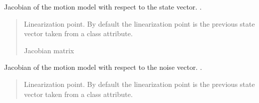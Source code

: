 \documentclass[letterpaper,10pt,english]{sphinxmanual}
\begin{document}
\begin{fulllineitems}
\begin{fulllineitems}
\end{fulllineitems}


\begin{fulllineitems}
\label{\detokenize{GFLocalization:EKF_3DOFDifferentialDriveCtVelocity.EKF_3DOFDifferentialDriveCtVelocity.Jfx}}
\pysigstartsignatures
{}
\pysigstopsignatures
\sphinxAtStartPar
Jacobian of the motion model with respect to the state vector. .
\begin{quote}\begin{description}
\sphinxAtStartPar
{} \textendash{} Linearization point. By default the linearization point is the previous state vector taken from a class attribute.

\sphinxAtStartPar
Jacobian matrix

\end{description}\end{quote}

\end{fulllineitems}


\begin{fulllineitems}
\label{\detokenize{GFLocalization:EKF_3DOFDifferentialDriveCtVelocity.EKF_3DOFDifferentialDriveCtVelocity.Jfw}}
\pysigstartsignatures
{}
\pysigstopsignatures
\sphinxAtStartPar
Jacobian of the motion model with respect to the noise vector. .
\begin{quote}\begin{description}
\sphinxAtStartPar
{} \textendash{} Linearization point. By default the linearization point is the previous state vector taken from a class attribute.


\end{description}
\end{quote}
\end{fulllineitems}
\end{fulllineitems}
\end{document}
